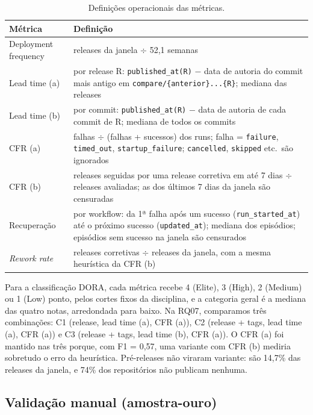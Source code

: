 \documentclass[12pt]{article}
\newcommand{\code}[1]{\texttt{\small #1}}
\begin{document}
\begin{table}[ht]
  \centering
  \caption{Definições operacionais das métricas.}
  \label{tab:defs}
  \small
  \begin{tabularx}{\textwidth}{lY}
    \toprule
    Métrica & Definição \\
    \midrule
    Deployment frequency & releases da janela $\div$ 52,1 semanas \\
    Lead time (a) & por release R: \code{published\_at(R)} $-$ data de autoria
      do commit mais antigo em \code{compare/\{anterior\}...\{R\}}; mediana das releases \\
    Lead time (b) & por commit: \code{published\_at(R)} $-$ data de autoria de
      cada commit de R; mediana de todos os commits \\
    CFR (a) & falhas $\div$ (falhas + sucessos) dos runs; falha =
      \code{failure}, \code{timed\_out}, \code{startup\_failure};
      \code{cancelled}, \code{skipped} etc.\ são ignorados \\
    CFR (b) & releases seguidas por uma release corretiva em até 7 dias
      $\div$ releases avaliadas; as dos últimos 7 dias da janela são censuradas \\
    Recuperação & por workflow: da 1ª falha após um sucesso
      (\code{run\_started\_at}) até o próximo sucesso (\code{updated\_at});
      mediana dos episódios; episódios sem sucesso na janela são censurados \\
    \emph{Rework rate} & releases corretivas $\div$ releases da janela,
      com a mesma heurística da CFR (b) \\
    \bottomrule
  \end{tabularx}
\end{table}

Para a classificação DORA, cada métrica recebe 4 (Elite), 3 (High), 2
(Medium) ou 1 (Low) ponto, pelos cortes fixos da disciplina, e a categoria
geral é a mediana das quatro notas, arredondada para baixo. Na RQ07,
comparamos três combinações: C1 (release, lead time (a), CFR (a)), C2
(release + tags, lead time (a), CFR (a)) e C3 (release + tags, lead time (b),
CFR (a)). O CFR (a) foi mantido nas três porque, com F1 = 0,57, uma variante
com CFR (b) mediria sobretudo o erro da heurística. Pré-releases não viraram
variante: são 14,7\% das releases da janela, e 74\% dos repositórios não
publicam nenhuma.

\subsection{Validação manual (amostra-ouro)}
\end{document}
